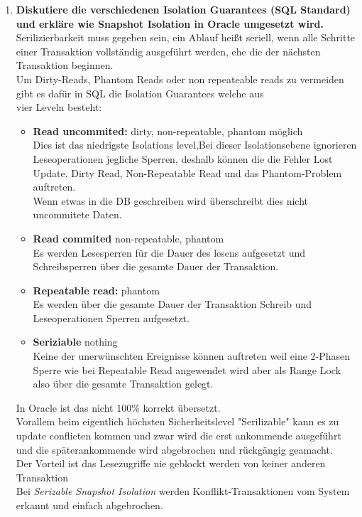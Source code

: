 \documentclass[12pt]{article}\pagestyle{myheadings}
\theoremstyle{plain}
\begin{document}
\begin{enumerate}
\item \textbf{Diskutiere die verschiedenen Isolation Guarantees (SQL Standard) und erkläre wie Snapshot Isolation in
Oracle umgesetzt wird.
} \\
Serilizierbarkeit muss gegeben sein, ein Ablauf heißt seriell, wenn alle Schritte einer Transaktion
vollständig ausgeführt werden, ehe die der nächsten Transaktion
beginnen.\\
Um Dirty-Reads, Phantom Reads oder non repeateable reads zu vermeiden gibt es dafür in SQL die Isolation Guarantees welche aus \\
vier Leveln besteht:\\
\begin{itemize}
\item \textbf{Read uncommited:} dirty, non-repeatable, phantom
möglich\\
Dies ist das niedrigste Isolations level,Bei dieser Isolationsebene ignorieren Leseoperationen jegliche Sperren, deshalb können die die Fehler Lost Update, Dirty Read, Non-Repeatable Read und das Phantom-Problem auftreten.\\
Wenn etwas in die DB geschreiben wird überschreibt dies nicht uncommitete Daten.\\
\item \textbf{Read commited} non-repeatable, phantom\\ Es werden Lesesperren für die Dauer des lesens aufgesetzt und Schreibsperren über die gesamte Dauer der Transaktion.\\
\item \textbf{Repeatable read:} phantom\\
Es werden über die gesamte Dauer der Transaktion Schreib und Leseoperationen Sperren aufgesetzt.
\item \textbf{Seriziable} nothing\\
Keine der unerwünschten Ereignisse können auftreten weil eine 2-Phasen Sperre wie bei Repeatable Read angewendet wird aber als Range Lock also über die gesamte Transaktion gelegt.
\end{itemize}
In Oracle ist das nicht 100\% korrekt übersetzt.\\
Vorallem beim eigentlich höchsten Sicherheitslevel "Serilizable" kann es zu update conflicten kommen und zwar wird die erst ankommende ausgeführt und die späterankommende wird abgebrochen und rückgängig geamacht.\\
Der Vorteil ist das Lesezugriffe nie geblockt werden von keiner anderen Transaktion\\
Bei \textit{Serizable Snapshot Isolation} werden Konflikt-Transaktionen vom System erkannt und einfach abgebrochen.


\end{enumerate}
\end{document}
